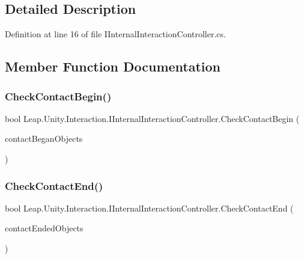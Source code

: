 \subsection{Detailed Description}


Definition at line 16 of file I\+Internal\+Interaction\+Controller.\+cs.



\subsection{Member Function Documentation}
\mbox{\label{interface_leap_1_1_unity_1_1_interaction_1_1_i_internal_interaction_controller_a99417266a54d0379e3ac7434e37ee709}} 
\subsubsection{\texorpdfstring{CheckContactBegin()}{CheckContactBegin()}}
{\footnotesize\ttfamily bool Leap.\+Unity.\+Interaction.\+I\+Internal\+Interaction\+Controller.\+Check\+Contact\+Begin (\begin{DoxyParamCaption}\item[{out Hash\+Set$<$ \mbox{\hyperlink{interface_leap_1_1_unity_1_1_interaction_1_1_i_interaction_behaviour}{I\+Interaction\+Behaviour}} $>$}]{contact\+Began\+Objects }\end{DoxyParamCaption})}

\mbox{\label{interface_leap_1_1_unity_1_1_interaction_1_1_i_internal_interaction_controller_a84c78587d30c7ff285008e20b4e03dee}} 
\subsubsection{\texorpdfstring{CheckContactEnd()}{CheckContactEnd()}}
{\footnotesize\ttfamily bool Leap.\+Unity.\+Interaction.\+I\+Internal\+Interaction\+Controller.\+Check\+Contact\+End (\begin{DoxyParamCaption}\item[{out Hash\+Set$<$ \mbox{\hyperlink{interface_leap_1_1_unity_1_1_interaction_1_1_i_interaction_behaviour}{I\+Interaction\+Behaviour}} $>$}]{contact\+Ended\+Objects }\end{DoxyParamCaption})}

